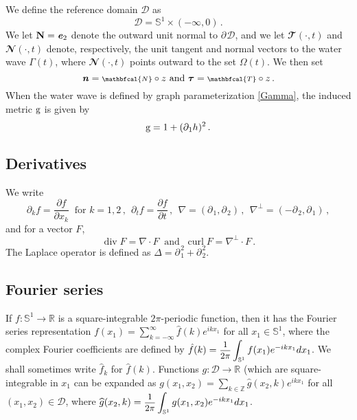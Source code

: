 \documentclass[11pt]{article}
\theoremstyle{plain}
\theoremstyle{definition}
\theoremstyle{definition}
\def\bbR{{\mathbb R}}
\def\bbZ{{\mathbb Z}}
\def\D{{\mathcal D}}
\def\bN{{\mathbf N}}
\def\bfn{{\mathbf n}}
\def\rg{{\rm g}}
\def\e{\text{\bf\emph{e}}}
\def\bfn{\text{\bf\emph{n}}}
\def\p{\text{\bf\emph{p}}}
\def\ft #1{{\widehat{#1}}}
\def\p{{\partial\hspace{1pt}}}
\def\smallexp#1{{\text{\small #1}}}
\def\smallint#1#2{{\text{\small$\displaystyle{}\int_{#1}^{#2}$}}}
\def\dfrac#1#2{\smallexp{$\displaystyle{}\frac{#1}{#2}$}}
\def\nn{{\scriptstyle \mathbfcal{N} }}
\def\tt{{\scriptstyle \mathbfcal{T} }}
\begin{document}
We define the reference domain $\D$ as
\begin{equation}\label{D}
\D = \mathbb{S}^1 \times (-\infty, 0) \,.
\end{equation}
We let $\bN =\e_2$ denote the outward unit normal to $\p \D $, and we let $\tt(\cdot ,t)$ and $\nn( \cdot , t)$ denote, respectively, the unit tangent and normal vectors to
the water wave $\Gamma(t)$, where $\nn( \cdot ,t)$ points outward to the set $\Omega(t)$.
We then set
$$
\bfn = \nn \circ z\text{ and } \boldsymbol{\tau}=\tt \circ z \,.
$$
When the water wave is defined by  graph parameterization \eqref{Gamma}, the induced  metric $\rg$ is given by
\begin{equation}\label{metric}
\rg =  1+ (\p_{\!1} h)^2\,.
\end{equation}

\subsection{Derivatives} We write
$$
\partial_k f=\frac{\partial f}{\partial x_k}\ \text{ for } k=1,2\,, \ \  \partial_t f=\frac{\partial f}{\partial t} \,, \ \
\nabla=(\p_{\!1}, \p_2)\,,    \ \ \nabla^\perp=(- \p_2, \p_{\!1}) \,,
$$
and for a vector $F$,
$$
\operatorname{div} F=  \nabla \cdot F  \ \text{ and } \ \operatorname{curl} F = \nabla ^\perp\cdot F \,.
$$
The Laplace operator is defined as $ \Delta = \p_{\!1}^2 + \p_2^2$.

\subsection{Fourier series}\label{sec::Fourier}
If  $f:\mathbb{S}^1\to\bbR$ is a square-integrable $2\pi$-periodic function,  then it has the Fourier series representation
$f(x_1) = \sum\limits_{k=- \infty }^ \infty  \ft{f}(k) e^{ikx_1}$ for all $x_1 \in \mathbb{S}^1$, where the complex Fourier coefficients
are defined by $\hat f(k) = {\dfrac{1}{2\pi}} \smallint{\mathbb{S}^1}{}\, f(x_1)
e^{-ikx_1}dx_1$.  We shall sometimes write $\hat f_k$ for $\hat f(k)$.
Functions  $g:\D \to \bbR$ (which are square-integrable in $x_1$ can be expanded as
$
g(x_1,x_2) = \sum\limits_{k\in \bbZ} \ft{g}(x_2,k) e^{ikx_1}$ for all $(x_1,x_2) \in \D$, where
$\ft{g}(x_2,k) = {\dfrac{1}{2\pi}} \smallint{\mathbb{S}^1}{}\, g(x_1, x_2)
e^{-ikx_1}dx_1$.
\end{document}
